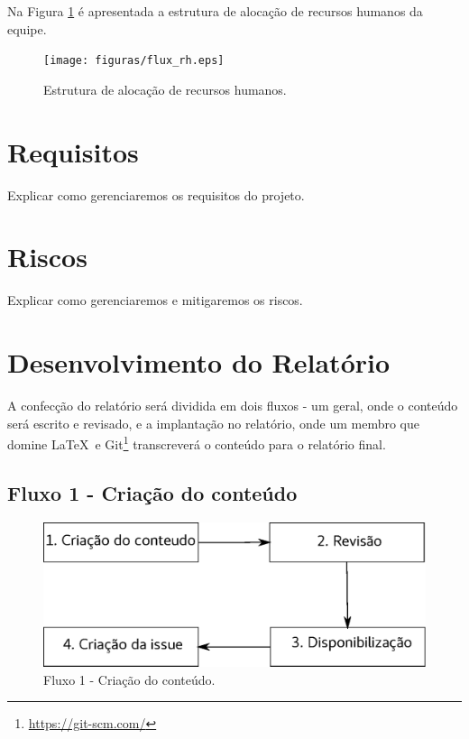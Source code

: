 Na Figura \ref{flux_rh} é apresentada a estrutura de alocação de recursos humanos da equipe.

\begin{figure}[h]
    \centering
    \label{flux_rh}
    \texttt{[image: figuras/flux\_rh.eps]}
    \caption{Estrutura de alocação de recursos humanos.}
\end{figure}

\section{Requisitos}

Explicar como gerenciaremos os requisitos do projeto.

\section{Riscos}

Explicar como gerenciaremos e mitigaremos os riscos.

\section{Desenvolvimento do Relatório}

A confecção do relatório será dividida em dois fluxos - um geral, onde o
conteúdo será escrito e revisado, e a implantação no relatório, onde um
membro que domine \LaTeX\ e
Git\footnote{\url{https://git-scm.com/}} transcreverá o conteúdo para o
relatório final.

\subsection{Fluxo 1 - Criação do conteúdo}

\begin{figure}[H]
  \centering
    \includegraphics[width=\textwidth]{figuras/fluxo1.eps}
  \caption{Fluxo 1 - Criação do conteúdo.}
  \label{fig:fluxo1}
\end{figure}

